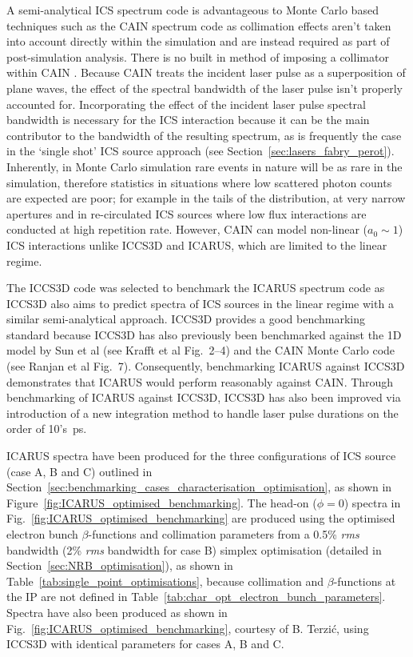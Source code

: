 \documentclass[../main.tex]{subfiles}
\begin{document}
A semi-analytical ICS spectrum code is advantageous to Monte Carlo based techniques such as the \textsc{CAIN} spectrum code as collimation effects aren't taken into account directly within the simulation and are instead required as part of post-simulation analysis. There is no built in method of imposing a collimator within \textsc{CAIN} \cite{chen1995cain}. Because \textsc{CAIN} treats the incident laser pulse as a superposition of plane waves, the effect of the spectral bandwidth of the laser pulse isn't properly accounted for. Incorporating the effect of the incident laser pulse spectral bandwidth is necessary for the ICS interaction because it can be the main contributor to the bandwidth of the resulting spectrum, as is frequently the case in the `single shot' ICS source approach (see Section~\ref{sec:lasers_fabry_perot}). Inherently, in Monte Carlo simulation rare events in nature will be as rare in the simulation, therefore statistics in situations where low scattered photon counts are expected are poor; for example in the tails of the distribution, at very narrow apertures \cite{ranjan2018simulation} and in re-circulated ICS sources where low flux interactions are conducted at high repetition rate. However, \textsc{CAIN} can model non-linear ($a_{0} \sim 1$) ICS interactions unlike \textsc{ICCS3D} and \textsc{ICARUS}, which are limited to the linear regime.  

The \textsc{ICCS3D} code \cite{krafft2016laser,ranjan2018simulation} was selected to benchmark the \textsc{ICARUS} spectrum code as \textsc{ICCS3D} also aims to predict spectra of ICS sources in the linear regime with a similar semi-analytical approach. \textsc{ICCS3D} provides a good benchmarking standard because  \textsc{ICCS3D} has also previously been benchmarked against the 1D model by Sun et al \cite{sun2009energy} (see Krafft et al \cite{krafft2016laser} Fig.~2--4) and the \textsc{CAIN} Monte Carlo code (see Ranjan et al\cite{ranjan2018simulation} Fig.~7). Consequently, benchmarking \textsc{ICARUS} against \textsc{ICCS3D} demonstrates that \textsc{ICARUS} would perform reasonably against \textsc{CAIN}. Through benchmarking of \textsc{ICARUS} against \textsc{ICCS3D}, \textsc{ICCS3D} has also been improved via introduction of a new integration method to handle laser pulse durations on the order of 10's~\si{\pico\second}.

\textsc{ICARUS} spectra have been produced for the three configurations of ICS source (case A, B and C) outlined in Section~\ref{sec:benchmarking_cases_characterisation_optimisation}, as shown in Figure~\ref{fig:ICARUS_optimised_benchmarking}. The head-on ($\phi=0$) spectra in Fig.~\ref{fig:ICARUS_optimised_benchmarking} are produced using the optimised electron bunch $\beta$-functions and collimation parameters from a 0.5\% \textit{rms} bandwidth (2\% \textit{rms} bandwidth for case B) simplex optimisation (detailed in Section~\ref{sec:NRB_optimisation}), as shown in Table~\ref{tab:single_point_optimisations}, because collimation and $\beta$-functions at the IP are not defined in Table~\ref{tab:char_opt_electron_bunch_parameters}. Spectra have also been produced as shown in Fig.~\ref{fig:ICARUS_optimised_benchmarking}, courtesy of B. Terzi\'{c}, using \textsc{ICCS3D} with identical parameters for cases A, B and C.       
\end{document}
